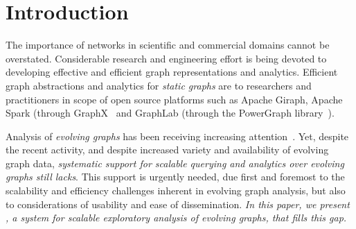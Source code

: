 \section{Introduction}
\label{sec:intro}

The importance of networks in scientific and commercial domains cannot
be overstated.  
Considerable research and engineering effort is being devoted to developing
effective and efficient graph representations and analytics.
Efficient graph abstractions and analytics for {\em static graphs} are
to researchers and practitioners in scope of open source platforms
such as Apache Giraph, Apache Spark (through
GraphX~\cite{DBLP:conf/osdi/GonzalezXDCFS14} and GraphLab (through
the PowerGraph library~\cite{DBLP:conf/osdi/GonzalezLGBG12}).

Analysis of {\em evolving graphs} has been receiving
increasing attention~\cite{DBLP:journals/csur/AggarwalS14,Chan2008,Kan2009,DBLP:journals/tos/MiaoHLWYZPCC15,Ren2011,Semertzidis2015}.
%
Yet, despite the recent activity, and
despite increased variety and availability of evolving graph data,
{\em systematic support for scalable querying and analytics over
  evolving graphs still lacks}.  This support is urgently needed, due
first and foremost to the scalability and efficiency challenges
inherent in evolving graph analysis, but also to considerations of
usability and ease of dissemination.  {\em In this paper, we present
  \ql, a system for scalable exploratory analysis of evolving graphs,
  that fills this gap.}

